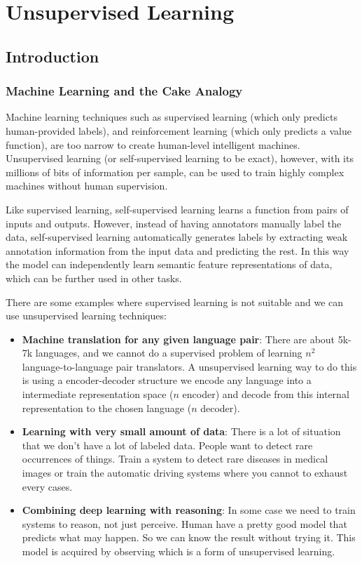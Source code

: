 \chapter{Unsupervised Learning}

\section{Introduction}

\subsection{Machine Learning and the Cake Analogy}

Machine learning techniques such as supervised learning (which only predicts human-provided labels), and reinforcement learning (which only predicts a value function), are too narrow to create human-level intelligent machines. Unsupervised learning (or self-supervised learning to be exact), however, with its millions of bits of information per sample, can be used to train highly complex machines without human supervision.

Like supervised learning, self-supervised learning learns a function from pairs of inputs and outputs. However, instead of having annotators manually label the data, self-supervised learning automatically generates labels by extracting weak annotation information from the input data and predicting the rest. In this way the model can independently learn semantic feature representations of data, which can be further used in other tasks.

There are some examples where supervised learning is not suitable and we can use unsupervised learning techniques:
\begin{itemize}
    \item \textbf{Machine translation for any given language pair}: There are about 5k-7k languages, and we cannot do a supervised problem of learning $n^2$ language-to-language pair translators. A unsupervised learning way to do this is using a encoder-decoder structure we encode any language into a intermediate representation space ($n$ encoder) and decode from this internal representation to the chosen language ($n$ decoder).

    \item \textbf{Learning with very small amount of data}: There is a lot of situation that we don't have a lot of labeled data. People want to detect rare occurrences of things. Train a system to detect rare diseases in medical images or train the automatic driving systems where you cannot to exhaust every cases.

    \item \textbf{Combining deep learning with reasoning}: In some case we need to train systems to reason, not just perceive. Human have a pretty good model that predicts what may happen. So we can know the result without trying it. This model is acquired by observing which is a form of unsupervised learning.
\end{itemize}

